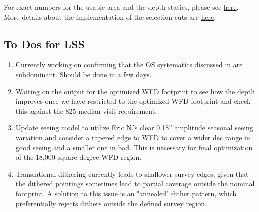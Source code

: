 For exact numbers for the usable area and the depth statics, please see \href{https://github.com/LSSTDESC/ObsStrat/tree/static/static}{here}. More details about the implementation of the selection cuts are \href{https://github.com/LSSTDESC/ObsStrat/tree/static/static/depth\_cuts}{here}. 

\subsection{To Dos for LSS}
\begin{enumerate}
\item Currently working on confirming that the OS systematics discussed in \citet{Awan+2016} are subdominant. Should be done in a few days.
\item Waiting on the  output for the optimized WFD footprint to see how the depth improves once we have restricted to the optimized WFD footprint and check this against the 825 median visit requirement.
\item Update seeing model to utilize Eric N.'s clear 0.18'' amplitude seasonal seeing variation and consider a tapered edge to WFD to cover a wider dec range in good seeing and a smaller one in bad.  This is necessary for final optimization of the 18,000 square degree WFD region. 
\item Translational dithering currently leads to shallower survey edges, given that the dithered pointings sometimes lead to partial coverage outside the nominal footprint. A solution to this issue is an "annealed" dither pattern, which preferentially rejects dithers outside the defined survey region.  
\end{enumerate}

